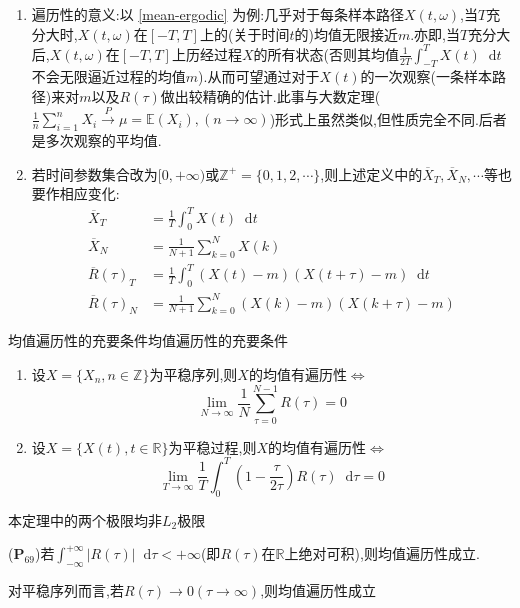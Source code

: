 \documentclass{elegantbook}
\renewcommand\d{\mathop{}\!\mathrm{d}}
\newcommand\E{\mathbb{E}}
\begin{document}
\begin{remark}
	\begin{enumerate}
		\item 遍历性的意义:以 \ref*{mean-ergodic} 为例:几乎对于每条样本路径$X(t,\omega)$,当$T$充分大时,$X(t,\omega)$在$[-T,T]$上的(关于时间$t$的)均值无限接近$m$.亦即,当$T$充分大后,$X(t,\omega)$在$[-T,T]$上历经过程$X$的所有状态(否则其均值$\displaystyle \frac{1}{2T}\int_{-T}^{T}X(t)\d t$不会无限逼近过程的均值$m$).从而可望通过对于$X(t)$的一次观察(一条样本路径)来对$m$以及$R(\tau )$做出较精确的估计.此事与大数定理($\frac{1}{n}\sum_{i=1}^{n}X_i\xrightarrow{P}\mu=\E(X_i),(n\to \infty)$)形式上虽然类似,但性质完全不同.后者是多次观察的平均值.
		\item 若时间参数集合改为$[0,+\infty)$或$\mathbb{Z}^+=\{0,1,2,\cdots \}$,则上述定义中的$\overline{X}_T,\overline{X}_N,\cdots $等也要作相应变化:
					\[\begin{aligned}
						\overline{X}_T &= \frac{1}{T}\int_{0}^{T}X(t)\d t\\
						\overline{X}_N &= \frac{1}{N+1}\sum_{k=0}^{N}X(k)\\
						\overline{R}(\tau	)_T &= \frac{1}{T}\int_{0}^{T}(X(t)-m)(X(t+\tau)-m)\d t\\
						\overline{R}(\tau	)_N &= \frac{1}{N+1}\sum_{k=0}^{N}(X(k)-m)(X(k+\tau)-m)
					\end{aligned}\]
	\end{enumerate}
\end{remark}

\begin{theorem}{均值遍历性的充要条件}{均值遍历性的充要条件}
	\begin{enumerate}[label=(\roman*)]
		\item 设$X=\{X_n,n\in\mathbb{Z}\}$为平稳序列,则$X$的均值有遍历性$\Longleftrightarrow$
					\[\lim_{N \to \infty}\frac{1}{N}\sum_{\tau=0}^{N-1}R(\tau) = 0\]
		\item 设$X=\{X(t),t\in\mathbb{R}\}$为平稳过程,则$X$的均值有遍历性$\Longleftrightarrow$
					\[\lim_{T \to \infty}\frac{1}{T}\int_{0}^{T}\left(1-\frac{\tau}{2\tau}\right)R(\tau)\d \tau = 0\]
	\end{enumerate}
\end{theorem}
\begin{remark}
	本定理中的两个极限均非$L_2$极限
\end{remark}

\begin{corollary}{}{}
	($\mathbf{P}_{69}$)若$\displaystyle \int_{-\infty}^{+\infty}|R(\tau)|\d \tau < +\infty$(即$R(\tau)$在$\mathbb{R}$上绝对可积),则均值遍历性成立.
\end{corollary}
\begin{corollary}{}{}
	对平稳序列而言,若$R(\tau)\to 0(\tau \to \infty)$,则均值遍历性成立
\end{corollary}
\end{document}
